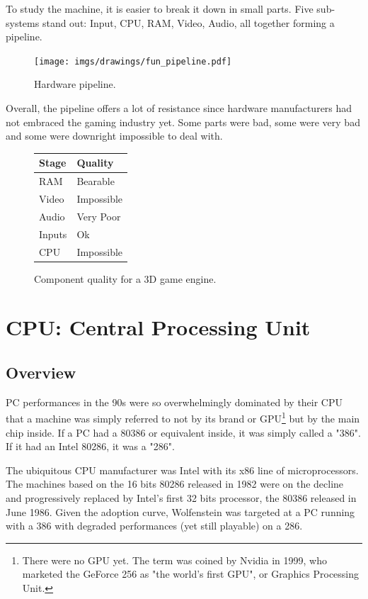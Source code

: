 \documentclass[book.tex]{subfiles}
\begin{document}
To study the machine, it is easier to break it down in small parts. Five sub-systems stand out: Input, CPU, RAM, Video, Audio, all together forming a pipeline.\\
\begin{figure}[H]
\centering
\texttt{[image: imgs/drawings/fun\_pipeline.pdf]}
\caption{Hardware pipeline.}
\label{fig:digraph}
\end{figure}

Overall, the pipeline offers a lot of resistance since hardware manufacturers had not embraced the gaming industry yet. Some parts were bad, some were very bad and some were downright impossible to deal with.\\
\par

\begin{figure}[H]
\centering
\begin{tabularx}{\textwidth}{ X X  }
  \toprule
  \textbf{Stage} & \textbf{Quality} \\ \bottomrule
  RAM & Bearable \\ 
  Video & Impossible \\ 
  Audio & Very Poor \\ 
  Inputs & Ok \\ 
  CPU & Impossible \\ \bottomrule
\end{tabularx}
\caption{Component quality for a 3D game engine.}
\end{figure}



\section{CPU: Central Processing Unit}
  \subsection{Overview}
  PC performances in the 90s were so overwhelmingly dominated by their CPU that a machine was simply referred to not by its brand or GPU\footnote{There were no GPU yet. The term was coined by Nvidia in 1999, who marketed the GeForce 256 as "the world's first GPU", or Graphics Processing Unit.} but by the main chip inside. If a PC had a 80386 or equivalent inside, it was simply called a "386". If it had an Intel 80286, it was a "286".\\
\par
  The ubiquitous CPU manufacturer was Intel with its x86 line of microprocessors. The machines based on the 16 bits 80286 released in 1982 were on the decline and progressively replaced by Intel's first 32 bits processor, the 80386 released in June 1986. Given the adoption curve, Wolfenstein was targeted at a PC running with a 386 with degraded performances (yet still playable) on a 286.\\
\par
\end{document}
